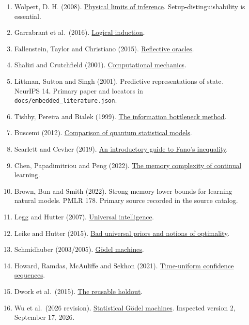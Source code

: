 \documentclass[
  10pt,
]{article}
\providecommand{\tightlist}{%
  \setlength{\itemsep}{0pt}\setlength{\parskip}{0pt}}
\providecommand{\tightlist}{%
  \setlength{\itemsep}{0pt}\setlength{\parskip}{0pt}}
\begin{document}
\begin{enumerate}
\def\labelenumi{\arabic{enumi}.}
\tightlist
\item
  Wolpert, D. H. (2008). \href{https://arxiv.org/abs/0708.1362v2}{Physical limits of inference}. Setup-distinguishability is essential.
\item
  Garrabrant et al.~(2016). \href{https://arxiv.org/abs/1609.03543v5}{Logical induction}.
\item
  Fallenstein, Taylor and Christiano (2015). \href{https://arxiv.org/abs/1508.04145v1}{Reflective oracles}.
\item
  Shalizi and Crutchfield (2001). \href{https://arxiv.org/abs/cond-mat/9907176v2}{Computational mechanics}.
\item
  Littman, Sutton and Singh (2001). Predictive representations of state. NeurIPS 14. Primary paper and locators in \texttt{docs/embedded\_literature.json}.
\item
  Tishby, Pereira and Bialek (1999). \href{https://arxiv.org/abs/physics/0004057v1}{The information bottleneck method}.
\item
  Buscemi (2012). \href{https://arxiv.org/abs/1004.3794v4}{Comparison of quantum statistical models}.
\item
  Scarlett and Cevher (2019). \href{https://arxiv.org/abs/1901.00555}{An introductory guide to Fano's inequality}.
\item
  Chen, Papadimitriou and Peng (2022). \href{https://arxiv.org/abs/2204.10830}{The memory complexity of continual learning}.
\item
  Brown, Bun and Smith (2022). Strong memory lower bounds for learning natural models. PMLR 178. Primary source recorded in the source catalog.
\item
  Legg and Hutter (2007). \href{https://arxiv.org/abs/0712.3329}{Universal intelligence}.
\item
  Leike and Hutter (2015). \href{https://arxiv.org/abs/1510.04931}{Bad universal priors and notions of optimality}.
\item
  Schmidhuber (2003/2005). \href{https://arxiv.org/abs/cs/0309048v5}{Gödel machines}.
\item
  Howard, Ramdas, McAuliffe and Sekhon (2021). \href{https://arxiv.org/abs/1810.08240}{Time-uniform confidence sequences}.
\item
  Dwork et al.~(2015). \href{https://arxiv.org/abs/1506.02629}{The reusable holdout}.
\item
  Wu et al.~(2026 revision). \href{https://arxiv.org/abs/2510.10232v2}{Statistical Gödel machines}. Inspected version 2, September 17, 2026.
\end{enumerate}
\end{document}
